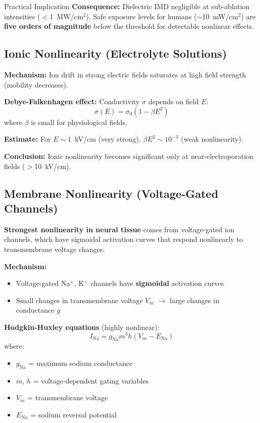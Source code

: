 \begin{calloutbox}{Practical Implication}
\textbf{Consequence:} Dielectric IMD negligible at sub-ablation intensities ($<$1~MW/cm$^2$). Safe exposure levels for humans ($\sim$10~mW/cm$^2$) are \textbf{five orders of magnitude} below the threshold for detectable nonlinear effects.
\end{calloutbox}

\subsection{Ionic Nonlinearity (Electrolyte Solutions)}

\textbf{Mechanism:} Ion drift in strong electric fields saturates at high field strength (mobility decreases).

\textbf{Debye-Falkenhagen effect:} Conductivity $\sigma$ depends on field $E$:
\begin{equation}
\label{eq:debye-falkenhagen}
\sigma(E) = \sigma_0 (1 - \beta E^2)
\end{equation}
where $\beta$ is small for physiological fields.

\textbf{Estimate:} For $E \sim 1$~kV/cm (very strong), $\beta E^2 \sim 10^{-3}$ (weak nonlinearity).

\textbf{Conclusion:} Ionic nonlinearity becomes significant only at near-electroporation fields ($>$10~kV/cm).

\subsection{Membrane Nonlinearity (Voltage-Gated Channels)}

\begin{keyconcept}
\textbf{Strongest nonlinearity in neural tissue} comes from voltage-gated ion channels, which have sigmoidal activation curves that respond nonlinearly to transmembrane voltage changes.
\end{keyconcept}

\textbf{Mechanism:}
\begin{itemize}
\item Voltage-gated Na$^+$, K$^+$ channels have \textbf{sigmoidal} activation curves
\item Small changes in transmembrane voltage $V_m$ $\rightarrow$ large changes in conductance $g$
\end{itemize}

\textbf{Hodgkin-Huxley equations} (highly nonlinear):
\begin{equation}
\label{eq:hodgkin-huxley}
I_{\text{Na}} = g_{\text{Na}} m^3 h (V_m - E_{\text{Na}})
\end{equation}
where:
\begin{itemize}
\item $g_{\text{Na}}$ = maximum sodium conductance
\item $m$, $h$ = voltage-dependent gating variables
\item $V_m$ = transmembrane voltage
\item $E_{\text{Na}}$ = sodium reversal potential
\end{itemize}

